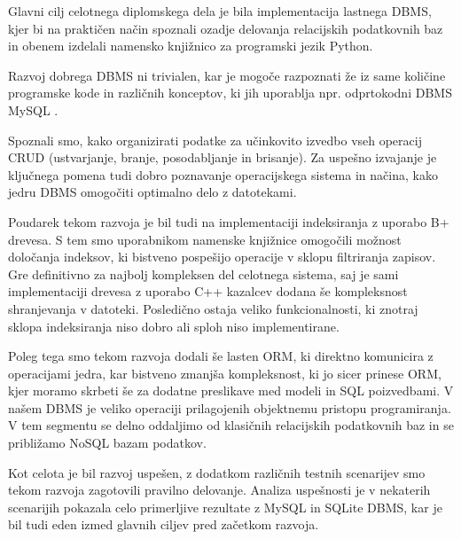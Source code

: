 \documentclass[a4paper,12pt,openright]{book}
\begin{document}
    Glavni cilj celotnega diplomskega dela je bila implementacija lastnega DBMS, kjer bi na praktičen način spoznali ozadje delovanja relacijskih podatkovnih baz in obenem izdelali namensko knjižnico za programski jezik Python.

    Razvoj dobrega DBMS ni trivialen, kar je mogoče razpoznati že iz same količine programske kode in različnih konceptov, ki jih uporablja npr. odprtokodni DBMS MySQL \cite{MYSQL_GITHUB}.
    
    Spoznali smo, kako organizirati podatke za učinkovito izvedbo vseh operacij CRUD (ustvarjanje, branje, posodabljanje in brisanje). Za uspešno izvajanje je ključnega pomena tudi dobro poznavanje operacijskega sistema in načina, kako jedru DBMS omogočiti optimalno delo z datotekami.
    
     Poudarek tekom razvoja je bil tudi na implementaciji indeksiranja z uporabo B+ drevesa. S tem smo uporabnikom namenske knjižnice omogočili možnost določanja indeksov, ki bistveno pospešijo operacije v sklopu filtriranja zapisov. Gre definitivno za najbolj kompleksen del celotnega sistema, saj je sami implementaciji drevesa z uporabo C++ kazalcev dodana še kompleksnost shranjevanja v datoteki. Posledično ostaja veliko funkcionalnosti, ki znotraj sklopa indeksiranja niso dobro ali sploh niso implementirane.
    
    Poleg tega smo tekom razvoja dodali še lasten ORM, ki direktno komunicira z operacijami jedra, kar bistveno zmanjša kompleksnost, ki jo sicer prinese ORM, kjer moramo skrbeti še za dodatne preslikave med modeli in SQL poizvedbami. V našem DBMS je veliko operaciji prilagojenih objektnemu pristopu programiranja. V tem segmentu se delno oddaljimo od klasičnih relacijskih podatkovnih baz in se približamo NoSQL bazam podatkov.
    
    Kot celota je bil razvoj uspešen, z dodatkom različnih testnih scenarijev smo tekom razvoja zagotovili pravilno delovanje. Analiza uspešnosti je v nekaterih scenarijih pokazala celo primerljive rezultate z MySQL in SQLite DBMS, kar je bil tudi eden izmed glavnih ciljev pred začetkom razvoja.


\raggedright

\printbibliography[heading=bibintoc,title={Literatura}]
\end{document}
